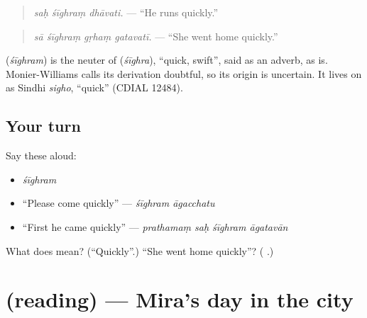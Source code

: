 \begin{quote}
\emph{saḥ śīghraṃ dhāvati.} — \textquotedblleft{}He runs quickly.\textquotedblright{}
\end{quote}

\begin{quote}
\textbf{   }
\end{quote}

\begin{quote}
\emph{sā śīghraṃ gṛhaṃ gatavatī.} — \textquotedblleft{}She went home quickly.\textquotedblright{}
\end{quote}

\begin{cousinweb}
\textbf{} (\emph{śīghram}) is the neuter of \textbf{} (\emph{śīghra}), \textquotedblleft{}quick, swift\textquotedblright{}, said as an adverb, as \textbf{} is. Monier-Williams calls its derivation doubtful, so its origin is uncertain. It lives on as Sindhi \emph{sigho}, \textquotedblleft{}quick\textquotedblright{} (CDIAL 12484).
\end{cousinweb}

\subsection*{Your turn}
Say these aloud:

\begin{itemize}
\raggedright
  \item \emph{śīghram}
  \item \textquotedblleft{}Please come quickly\textquotedblright{} — \emph{śīghram āgacchatu}
  \item \textquotedblleft{}First he came quickly\textquotedblright{} — \emph{prathamaṃ saḥ śīghram āgatavān}
\end{itemize}

\begin{tcolorbox}[breakable,colback=teal!4,colframe=teal!35!black,title={Before you move on}]
What does \textbf{} mean? (\textquotedblleft{}Quickly\textquotedblright{}.) \textquotedblleft{}She went home quickly\textquotedblright{}? (\textbf{   }.)
\end{tcolorbox}
\section[(reading)]{(reading) — Mira's day in the city}

\label{lesson:SA-C277-mira-nagaram-gatavati}



